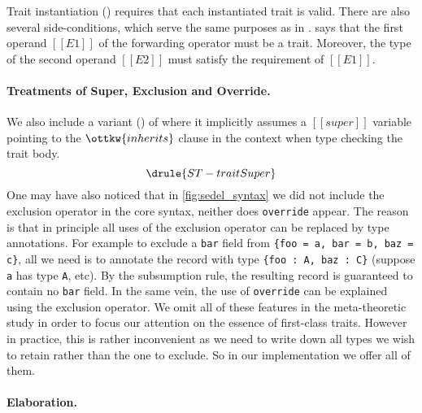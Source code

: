 Trait instantiation () requires that each instantiated trait is valid.
There are also several side-conditions, which serve the same
purposes as in .
 says that the first operand $[[E1]]$ of the forwarding operator must be a trait. Moreover, the type of the second operand
$[[E2]]$ must satisfy the requirement of $[[E1]]$.



\paragraph{Treatments of Super, Exclusion and Override.}

We also include a variant () of  where it
implicitly assumes a $[[super]]$ variable pointing to the $\ottkw{inherits}$
clause in the context when type checking the trait body.
\[
  \drule{ST-traitSuper}
\]
One may have also noticed that in \cref{fig:sedel_syntax} we did not include the
exclusion operator in the core \sedel syntax, neither does \lstinline{override}
appear. The reason is that in principle all uses of the exclusion operator can
be replaced by type annotations. For example to exclude a \lstinline{bar} field
from \lstinline${foo = a, bar = b, baz = c}$, all we need is to annotate the
record with type \lstinline${foo : A, baz : C}$ (suppose \lstinline{a} has type
\lstinline{A}, etc). By the subsumption rule, the resulting record is guaranteed
to contain no \lstinline{bar} field. In the same vein, the use of
\lstinline{override} can be explained using the exclusion operator. We omit all
of these features in the meta-theoretic study in order to focus our attention on
the essence of first-class traits. However in practice, this is rather
inconvenient as we need to write down all types we wish to retain rather than
the one to exclude. So in our implementation we offer all of them.

\paragraph{Elaboration.}

